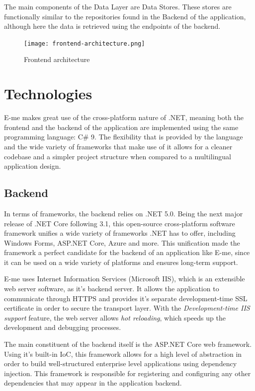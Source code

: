 The main components of the Data Layer are Data Stores.
These stores are functionally similar to the repositories found in the Backend of the application, although here the data is retrieved using the endpoints
of the backend.

\begin{figure}[H]
	\centering
	\texttt{[image: frontend-architecture.png]}
	\caption{Frontend architecture}
\end{figure}


\section{Technologies}

E-me makes great use of the cross-platform nature of .NET, meaning both the frontend and the backend of the application are implemented using the same
programming language: C\# 9.
The flexibility that is provided by the language and the wide variety of frameworks that make use of it allows for a cleaner codebase and a simpler
project structure when compared to a multilingual application design.

\subsection{Backend}

In terms of frameworks, the backend relies on .NET 5.0. Being the next major release of .NET Core following 3.1, this open-source cross-platform
software framework unifies a wide variety of frameworks .NET has to offer, including Windows Forms, ASP.NET Core, Azure and more.
This unification made the framework a perfect candidate for the backend of an application like E-me, since it can be used on a wide variety of
platforms and ensures long-term support.

E-me uses Internet Information Services (Microsoft IIS), which is an extensible web server software, as it's backend server.
It allows the application to communicate through HTTPS and provides it's separate development-time SSL certificate in order to secure the transport
layer. With the \emph{Development-time IIS support} feature, the web server allows \emph{hot reloading}, which speeds up the development and debugging
processes.

The main constituent of the backend itself is the ASP.NET Core web framework.
Using it's built-in IoC, this framework allows for a high level of abstraction in order to build well-structured enterprise level applications
using dependency injection.
This framework is responsible for registering and configuring any other dependencies that may appear in the application backend.

